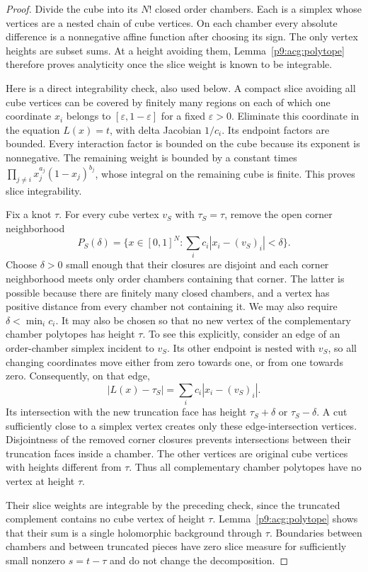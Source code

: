 \documentclass[11pt,a4paper]{article}
\theoremstyle{definition}
\theoremstyle{remark}
\numberwithin{equation}{section}
\begin{document}
\begin{proof}
Divide the cube into its $N!$ closed order chambers. Each is a
simplex whose vertices are a nested chain of cube vertices. On
each chamber every absolute difference is a nonnegative affine
function after choosing its sign. The only vertex heights are
subset sums. At a height avoiding them, Lemma~\ref{p9:acg:polytope}
therefore proves analyticity once the slice weight is known to be
integrable.

Here is a direct integrability check, also used below. A compact
slice avoiding all cube vertices can be covered by finitely many
regions on each of which one coordinate $x_i$ belongs to
$[\varepsilon,1-\varepsilon]$ for a fixed $\varepsilon>0$.
Eliminate this coordinate in the equation $L(x)=t$, with delta
Jacobian $1/c_i$. Its endpoint factors are bounded. Every
interaction factor is bounded on the cube because its exponent is
nonnegative. The remaining weight is bounded by a constant times
$\prod_{j\ne i}x_j^{a_j}(1-x_j)^{b_j}$, whose integral on the
remaining cube is finite. This proves slice integrability.

Fix a knot $\tau$. For every cube vertex $v_S$ with
$\tau_S=\tau$, remove the open corner neighborhood
\[
 P_S(\delta)=\{x\in[0,1]^N:
                      \sum_i c_i|x_i-(v_S)_i|<\delta\}.
\]
Choose $\delta>0$ small enough that their closures are disjoint and
each corner neighborhood meets only order chambers containing that
corner. The latter is possible because there are finitely many
closed chambers, and a vertex has positive distance from every
chamber not containing it. We may also require $\delta<\min_i c_i$.
It may also be chosen so that no new vertex of the complementary
chamber polytopes has height $\tau$. To see this explicitly,
consider an edge of an order-chamber simplex incident to $v_S$.
Its other endpoint is nested with $v_S$, so all changing coordinates
move either from zero towards one, or from one towards zero.
Consequently, on that edge,
\[
 |L(x)-\tau_S|=\sum_i c_i|x_i-(v_S)_i|.
\]
Its intersection with the new truncation face has height
$\tau_S+\delta$ or $\tau_S-\delta$. A cut sufficiently close to
a simplex vertex creates only these edge-intersection vertices.
Disjointness of the removed corner closures prevents intersections
between their truncation faces inside a chamber. The other
vertices are original cube vertices with heights different from
$\tau$. Thus all complementary chamber polytopes have no vertex
at height $\tau$.

Their slice weights are integrable by the preceding check, since
the truncated complement contains no cube vertex of height $\tau$.
Lemma~\ref{p9:acg:polytope} shows that their sum is a single
holomorphic background through $\tau$. Boundaries between chambers
and between truncated pieces have zero slice measure for sufficiently
small nonzero $s=t-\tau$ and do not change the decomposition.


\end{proof}
\end{document}
